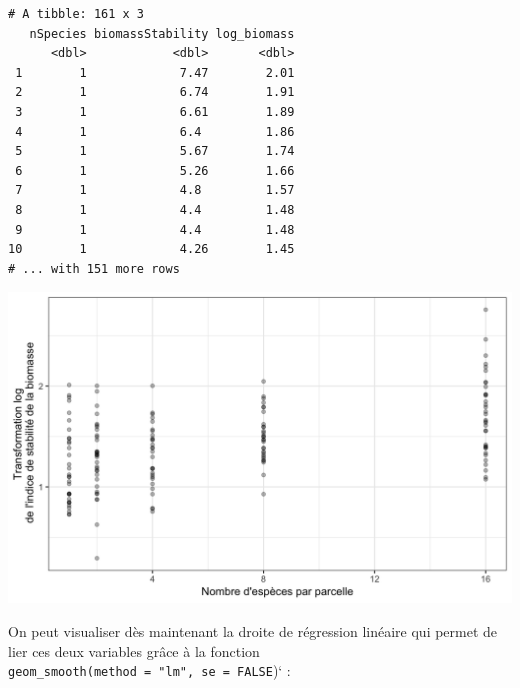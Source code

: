 \documentclass[a4paperpaper,]{article}
\newenvironment{Shaded}{\begin{snugshade}}{\end{snugshade}}
\newcommand{\CharTok}[1]{\textcolor[rgb]{0.57,0.30,0.62}{#1}}
\newcommand{\DataTypeTok}[1]{\textcolor[rgb]{0.00,0.34,0.68}{#1}}
\newcommand{\FloatTok}[1]{\textcolor[rgb]{0.69,0.50,0.00}{#1}}
\newcommand{\KeywordTok}[1]{\textcolor[rgb]{0.12,0.11,0.11}{\textbf{#1}}}
\newcommand{\NormalTok}[1]{\textcolor[rgb]{0.12,0.11,0.11}{#1}}
\newcommand{\OperatorTok}[1]{\textcolor[rgb]{0.12,0.11,0.11}{#1}}
\newcommand{\StringTok}[1]{\textcolor[rgb]{0.75,0.01,0.01}{#1}}
\begin{document}
\begin{verbatim}
# A tibble: 161 x 3
   nSpecies biomassStability log_biomass
      <dbl>            <dbl>       <dbl>
 1        1             7.47        2.01
 2        1             6.74        1.91
 3        1             6.61        1.89
 4        1             6.4         1.86
 5        1             5.67        1.74
 6        1             5.26        1.66
 7        1             4.8         1.57
 8        1             4.4         1.48
 9        1             4.4         1.48
10        1             4.26        1.45
# ... with 151 more rows
\end{verbatim}

\begin{Shaded}
\end{Shaded}

\begin{center}\includegraphics[width=0.9\linewidth]{figure/unnamed-chunk-116-1} \end{center}

On peut visualiser dès maintenant la droite de régression linéaire qui permet de lier ces deux variables grâce à la fonction \texttt{geom\_smooth(method\ =\ "lm",\ se\ =\ FALSE})` :
\end{document}
